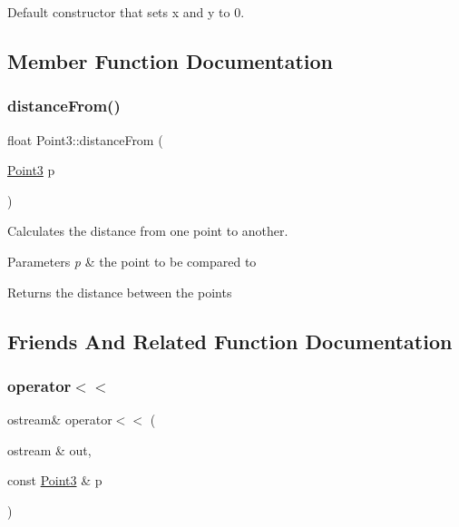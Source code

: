 Default constructor that sets x and y to 0. 



\subsection{Member Function Documentation}
\mbox{\label{class_point3_ae8c8f4565b4b17a1beee93f217954735}} 
\subsubsection{\texorpdfstring{distanceFrom()}{distanceFrom()}}
{\footnotesize\ttfamily float Point3\+::distance\+From (\begin{DoxyParamCaption}\item[{\mbox{\hyperlink{class_point3}{Point3}}}]{p }\end{DoxyParamCaption})}



Calculates the distance from one point to another. 


\begin{DoxyParams}{Parameters}
{\em p} & the point to be compared to \\
\hline
\end{DoxyParams}
\begin{DoxyReturn}{Returns}
the distance between the points 
\end{DoxyReturn}


\subsection{Friends And Related Function Documentation}
\mbox{\label{class_point3_ab58e7c0107133aba26fee83dcbff5764}} 
\subsubsection{\texorpdfstring{operator$<$$<$}{operator<<}}
{\footnotesize\ttfamily ostream\& operator$<$$<$ (\begin{DoxyParamCaption}\item[{ostream \&}]{out,  }\item[{const \mbox{\hyperlink{class_point3}{Point3}} \&}]{p }\end{DoxyParamCaption})\hspace{0.3cm}{\ttfamily [friend]}}



